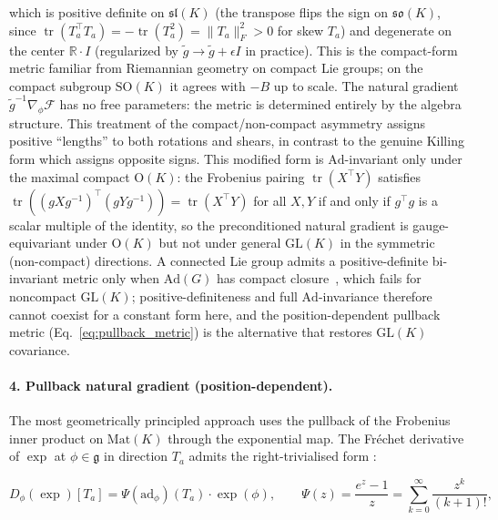 \documentclass[twoside,11pt]{article}
\begin{document}
which is positive definite on $\mathfrak{sl}(K)$ (the transpose flips the sign on $\mathfrak{so}(K)$, since $\operatorname{tr}(T_a^\top T_a) = -\operatorname{tr}(T_a^2) = \|T_a\|_F^2 > 0$ for skew $T_a$) and degenerate on the center $\mathbb{R} \cdot I$ (regularized by $\tilde{g} \to \tilde{g} + \epsilon I$ in practice). This is the compact-form metric familiar from Riemannian geometry on compact Lie groups; on the compact subgroup $\mathrm{SO}(K)$ it agrees with $-B$ up to scale. The natural gradient $\tilde{g}^{-1} \nabla_\phi \mathcal{F}$ has no free parameters: the metric is determined entirely by the algebra structure. This treatment of the compact/non-compact asymmetry assigns positive ``lengths'' to both rotations and shears, in contrast to the genuine Killing form which assigns opposite signs. This modified form is $\mathrm{Ad}$-invariant only under the maximal compact $\mathrm{O}(K)$: the Frobenius pairing $\operatorname{tr}(X^\top Y)$ satisfies $\operatorname{tr}((gXg^{-1})^\top(gYg^{-1})) = \operatorname{tr}(X^\top Y)$ for all $X, Y$ if and only if $g^\top g$ is a scalar multiple of the identity, so the preconditioned natural gradient is gauge-equivariant under $\mathrm{O}(K)$ but not under general $\mathrm{GL}(K)$ in the symmetric (non-compact) directions. A connected Lie group admits a positive-definite bi-invariant metric only when $\mathrm{Ad}(G)$ has compact closure~\citep{Milnor1976}, which fails for noncompact $\mathrm{GL}(K)$; positive-definiteness and full $\mathrm{Ad}$-invariance therefore cannot coexist for a constant form here, and the position-dependent pullback metric (Eq.~\ref{eq:pullback_metric}) is the alternative that restores $\mathrm{GL}(K)$ covariance.

\paragraph{4. Pullback natural gradient (position-dependent).}
The most geometrically principled approach uses the pullback of the Frobenius inner product on $\mathrm{Mat}(K)$ through the exponential map. The Fréchet derivative of $\exp$ at $\phi \in \mathfrak{g}$ in direction $T_a$ admits the right-trivialised form \citep[\S2.7 / Theorem 5.4]{Hall2015}:

\begin{equation}
D_\phi(\exp)[T_a] = \Psi(\mathrm{ad}_\phi)(T_a) \cdot \exp(\phi), \qquad \Psi(z) = \frac{e^z - 1}{z} = \sum_{k=0}^{\infty} \frac{z^k}{(k+1)!},
\end{equation}
\end{document}
